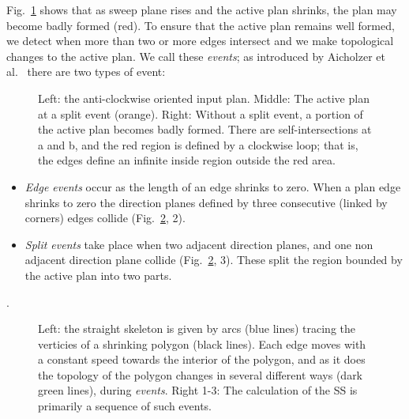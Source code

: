 Fig.~\ref{fig:skel_inverted} shows that as sweep plane rises and the active plan shrinks, the plan may become badly formed (red). To ensure that the active plan remains well formed, we detect when more than two or more edges intersect and we make topological changes to the active plan.  We call these \emph{events}; as introduced by Aicholzer et al.~\cite{Aichholzer95} there are two types of event:

\begin{figure}
  \centering
  \def\svgwidth{1.0\columnwidth}
  
  \caption[A badly formed plan]{\label{fig:skel_inverted} Left: the anti-clockwise oriented input plan. Middle: The active plan at a split event (orange). Right: Without a split event, a portion of the active plan becomes badly formed. There are self-intersections at a and b, and the red region is defined by a clockwise loop; that is, the edges define an infinite inside region outside the red area.}
\end{figure}

\begin{itemize}
\item
\emph{Edge events} occur as the length of an edge shrinks to zero. When a plan edge shrinks to zero the direction planes defined by three consecutive (linked by corners) edges collide (Fig.~\ref{fig:skel_intro}, 2). 
\item
\emph{Split events} take place when two adjacent direction planes, and one non adjacent direction plane collide (Fig.~\ref{fig:skel_intro}, 3). These split the region bounded by the active plan into two parts. 
\end{itemize}.

\begin{figure}
  \centering
  \def\svgwidth{1.0\columnwidth}
  
  \caption[Constructing the straight skeleton]{\label{fig:skel_intro} Left: the straight skeleton is given by arcs (blue lines) tracing the verticies of a shrinking polygon (black lines). Each edge moves with a constant speed towards the interior of the polygon, and as it does the topology of the polygon changes in several different ways (dark green lines), during \emph{events}. Right 1-3: The calculation of the SS is primarily a sequence of such events. 
}
\end{figure}


